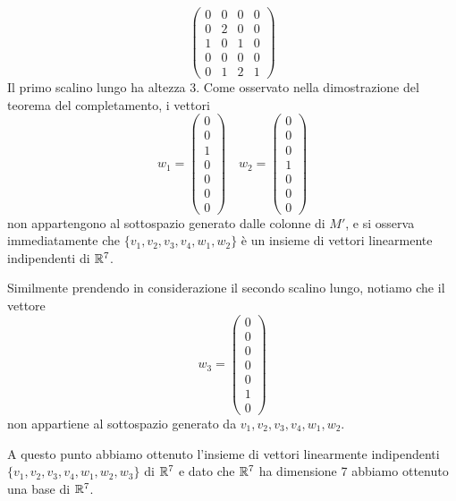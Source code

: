 \begin{example}
\[\begin{pmatrix}
			0 & 0 & 0 & 0 \\
			0 & 2 & 0 & 0 \\
			1 & 0 & 1 & 0 \\
			0 & 0 & 0 & 0 \\
			0 & 1 & 2 & 1
		\end{pmatrix}
	\]
	Il primo scalino lungo ha altezza 3. Come osservato nella dimostrazione
	del teorema del completamento, i vettori
	\[
		w_1 = \begin{pmatrix}
			0 \\ 0 \\ 1 \\ 0 \\ 0 \\ 0 \\ 0
		\end{pmatrix} \quad
		w_2 = \begin{pmatrix}
			0 \\ 0 \\ 0 \\ 1 \\ 0 \\ 0 \\ 0
		\end{pmatrix}
	\]
	non appartengono al sottospazio generato dalle colonne di $M'$, e si
	osserva immediatamente che $\{v_1, v_2, v_3, v_4, w_1, w_2\}$ è un
	insieme di vettori linearmente indipendenti di $\mathbb{R}^7$.

	Similmente prendendo in considerazione il secondo scalino lungo, notiamo
	che il vettore
	\[
		w_3 = \begin{pmatrix}
			0 \\ 0 \\ 0 \\ 0 \\ 0 \\ 1 \\ 0
		\end{pmatrix}
	\]
	non appartiene al sottospazio generato da $v_1, v_2, v_3, v_4, w_1, w_2$.

	A questo punto abbiamo ottenuto l'insieme di vettori linearmente indipendenti
	$\{v_1, v_2, v_3, v_4, w_1, w_2, w_3\}$ di $\mathbb{R}^7$ e dato che
	$\mathbb{R}^7$ ha dimensione 7 abbiamo ottenuto una base di $\mathbb{R}^7$.
\end{example}


